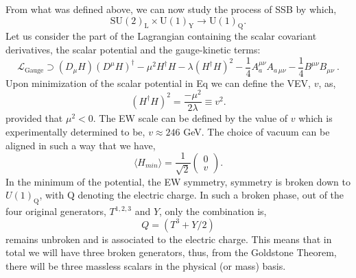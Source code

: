 \documentclass[10pt]{report}
\newcommand{\U}[1]{\mathrm{U}(1)_{\mathrm{#1}}}
\newcommand{\SU}[1]{\mathrm{SU}(2)_{\mathrm{#1}}}
\begin{document}
From what was defined above, we can now study the process of SSB by which, 
%
\begin{equation}
\SU{L}\times\U{Y} \rightarrow \U{Q}. 
\end{equation} 
%
Let us consider the part of the Lagrangian containing the scalar covariant derivatives, the scalar potential and the gauge-kinetic terms:
%
\begin{equation}
\mathcal{L}_{\text{Gauge}} \supset (D_\mu H)(D^\mu H)^\dagger - \mu^2 H^\dagger H - \lambda (H^\dagger H)^2 - \frac{1}{4}  A^{\mu \nu}_a A_{a \,\mu \nu}  
- \frac{1}{4}  B^{\mu \nu} B_{\mu \nu} \ . 
\label{eq:GaugeSM}
\end{equation} 
% 
Upon minimization of the scalar potential in Eq we can define the VEV, $v$, as, 
\begin{equation}
(H^\dagger H)^2 = \frac{-\mu^2}{2\lambda} \equiv  v^2  .
\end{equation} 
provided that $\mu^2 < 0$. 
%
The EW scale can be defined by the value of $v$ which is experimentally determined to be, $v \approx 246$ GeV. 
%
The choice of vacuum can be aligned in such a way that we have,
\begin{equation}
\label{Eq:HiggsVEV}
\langle H_{min} \rangle = \frac{1}{\sqrt{2}} \begin{pmatrix} 0 \\
v 
\end{pmatrix}  .
\end{equation}
In the minimum of the potential, the EW symmetry, symmetry is broken down to $U(1)_{\mathrm{Q}}$, with Q denoting the electric charge. In such a broken phase, out of the four original generators, $T^{1,2,3}$ and $Y$, only the combination is, 
\begin{equation}
\label{SM_Charge_Generator}
Q =  (T^3 + Y/2)
\end{equation}
remains unbroken and is associated to the electric  charge. This means that in total we will have three broken generators, thus, from the Goldstone Theorem, there will be three massless scalars in the physical (or mass) basis. 
\end{document}
